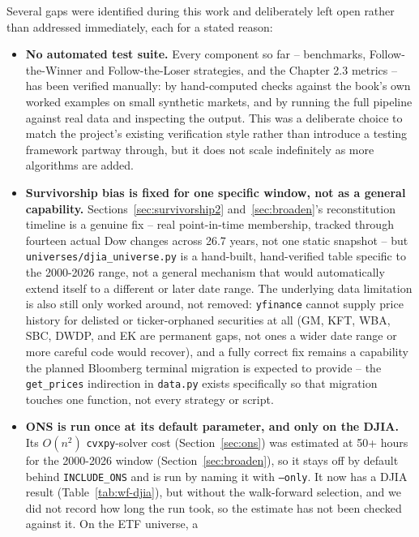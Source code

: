 \documentclass[11pt]{article}
\begin{document}
Several gaps were identified during this work and deliberately left open
rather than addressed immediately, each for a stated reason:

\begin{itemize}
    \item \textbf{No automated test suite.} Every component so far --
    benchmarks, Follow-the-Winner and Follow-the-Loser strategies, and
    the Chapter 2.3 metrics -- has been verified manually: by
    hand-computed checks against the book's own worked examples on small
    synthetic markets, and by running the full pipeline against real
    data and inspecting the output. This was a deliberate choice to match
    the project's existing verification style rather than introduce a
    testing framework partway through, but it does not scale indefinitely
    as more algorithms are added.
    \item \textbf{Survivorship bias is fixed for one specific window, not
    as a general capability.} Sections~\ref{sec:survivorship2}
    and~\ref{sec:broaden}'s reconstitution timeline is a genuine fix --
    real point-in-time membership, tracked through fourteen actual Dow
    changes across 26.7 years, not one static snapshot -- but
    \texttt{universes/djia\_universe.py} is a hand-built, hand-verified table
    specific to the 2000-2026 range, not a general mechanism that would
    automatically extend itself to a different or later date range. The
    underlying data limitation is also still only worked around, not
    removed: \texttt{yfinance} cannot supply price history for delisted
    or ticker-orphaned securities at all (GM, KFT, WBA, SBC, DWDP, and EK
    are permanent gaps, not ones a wider date range or more careful code
    would recover), and a fully correct fix remains a capability the
    planned Bloomberg terminal migration is expected to provide -- the
    \texttt{get\_prices} indirection in \texttt{data.py} exists
    specifically so that migration touches one function, not every
    strategy or script.
    \item \textbf{ONS is run once at its default parameter, and only on
    the DJIA.} Its $O(n^2)$ \texttt{cvxpy}-solver cost
    (Section~\ref{sec:ons}) was estimated at 50+ hours for the 2000-2026
    window (Section~\ref{sec:broaden}), so it stays off by default behind
    \texttt{INCLUDE\_ONS} and is run by naming it with \texttt{--only}.
    It now has a DJIA result (Table~\ref{tab:wf-djia}), but without the
    walk-forward selection, and we did not record how long the run took, so
    the estimate has not been checked against it. On the ETF universe, a

\end{itemize}
\end{document}
